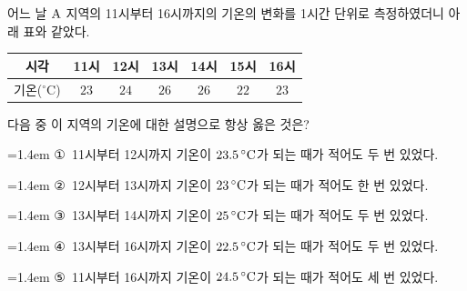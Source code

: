 어느 날 $\mathrm{A}$ 지역의 11시부터 16시까지의 기온의 변화를 1시간 단위로 측정하였더니 아래 표와 같았다. \par\smallskip\begin{center}\small\begin{tabular}{|c|c|c|c|c|c|c|}\hline 시각 & 11시 & 12시 & 13시 & 14시 & 15시 & 16시 \\ \hline 기온($^{\circ}\mathrm{C}$) & $23$ & $24$ & $26$ & $26$ & $22$ & $23$ \\ \hline\end{tabular}\end{center}\smallskip\noindent 다음 중 이 지역의 기온에 대한 설명으로 항상 옳은 것은?
\par\medskip\par\noindent\hangindent=1.4em {\small ①}\ 11시부터 12시까지 기온이 $23.5\mkern3mu ^{\circ}\mathrm{C}$가 되는 때가 적어도 두 번 있었다.\par\noindent\hangindent=1.4em {\small ②}\ 12시부터 13시까지 기온이 $23\mkern3mu ^{\circ}\mathrm{C}$가 되는 때가 적어도 한 번 있었다.\par\noindent\hangindent=1.4em {\small ③}\ 13시부터 14시까지 기온이 $25\mkern3mu ^{\circ}\mathrm{C}$가 되는 때가 적어도 두 번 있었다.\par\noindent\hangindent=1.4em {\small ④}\ 13시부터 16시까지 기온이 $22.5\mkern3mu ^{\circ}\mathrm{C}$가 되는 때가 적어도 두 번 있었다.\par\noindent\hangindent=1.4em {\small ⑤}\ 11시부터 16시까지 기온이 $24.5\mkern3mu ^{\circ}\mathrm{C}$가 되는 때가 적어도 세 번 있었다.\par\medskip
